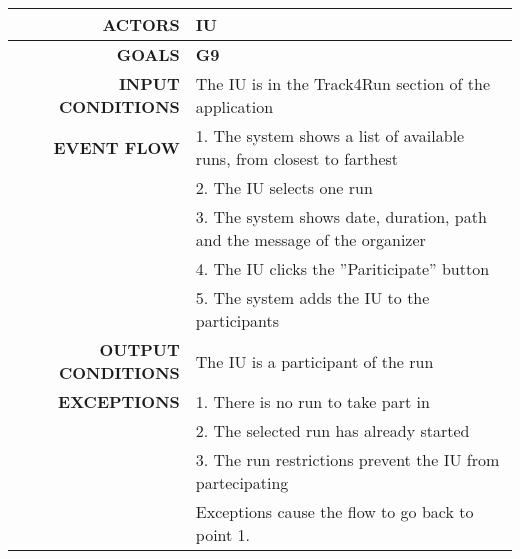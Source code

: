 \begin{table}[h!]
\begin{tabular}{|r|p{3in}|}
\hline
\textbf{ACTORS} & IU\\
\hline
\textbf{GOALS} & \textbf{G9}\\
\hline
\textbf{INPUT CONDITIONS} & The IU is in the Track4Run section of the application \\
\hline
\textbf{EVENT FLOW} 
&1. The system shows a list of available runs, from closest to farthest \\
&2. The IU selects one run \\
&3. The system shows date, duration, path and the message of the organizer\\
&4. The IU clicks the ''Pariticipate'' button\\
&5. The system adds the IU to the participants\\
\hline
\textbf{OUTPUT CONDITIONS} & The IU is a participant of the run\\
\hline
\textbf{EXCEPTIONS} 
&1. There is no run to take part in\\
&2. The selected run has already started\\
&3. The run restrictions prevent the IU from partecipating\\
&Exceptions cause the flow to go back to point 1.\\
\hline
\end{tabular}
\end{table}